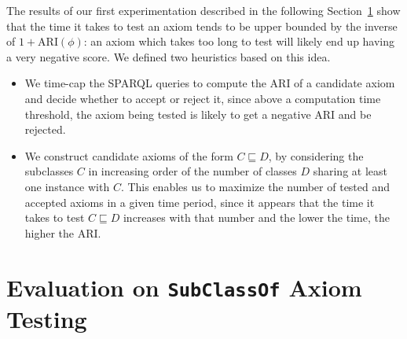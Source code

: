 \documentclass[conference]{IEEEtran}
\begin{document}
The results of our first experimentation described in the following Section~\ref{evaluation}
show that the time it takes to test an axiom tends to be upper bounded by the inverse
of $1 + \mathrm{ARI}(\phi)$: an axiom which takes too long to test will likely end up having a very negative score.
We defined two heuristics based on this idea.
\begin{itemize}
\item We time-cap the SPARQL queries to compute the ARI of a candidate axiom and decide whether to accept or reject it, since above a computation time threshold, the axiom being tested is likely to get a negative ARI and be rejected.
\item We construct candidate axioms of the form $C \sqsubseteq D$, by considering
the subclasses $C$ in increasing order of the number of classes $D$ sharing at least
one instance with $C$.
This enables us to maximize the number of tested and accepted axioms in a given time period,
since it appears that the time it takes to test $C \sqsubseteq D$ increases with that number
and the lower the time, the higher the ARI.
\end{itemize}

%
%


\section{Evaluation on \texttt{SubClassOf} Axiom Testing}
\label{evaluation}

\end{document}
